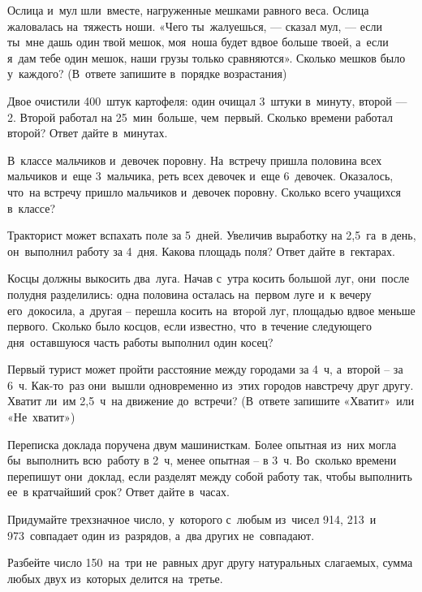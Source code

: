 Ослица и~мул шли~вместе, нагруженные мешками равного веса. Ослица жаловалась на~тяжесть ноши. 
«Чего ты~жалуешься, — сказал мул, — если ты~мне дашь один твой мешок, моя~ноша будет вдвое больше твоей, 
а~если я~дам тебе один мешок, наши грузы только сравняются». Сколько мешков было у~каждого? 
(В~ответе запишите в~порядке возрастания)

Двое очистили 400~штук картофеля: один очищал 3~штуки в~минуту, второй — 2. 
Второй работал на 25~мин~больше, чем~первый. Сколько времени работал второй? Ответ дайте в~минутах.

В~классе мальчиков и~девочек поровну. На~встречу пришла половина всех мальчиков и~еще 3~мальчика, 
реть всех девочек и~еще 6~девочек. Оказалось, что~на встречу пришло мальчиков и~девочек поровну. 
Сколько всего учащихся в~классе?

Тракторист может вспахать поле за 5~дней. Увеличив выработку на 2{,}5~га~в день, он~выполнил работу за 4~дня. 
Какова площадь поля? Ответ дайте в~гектарах.

Косцы должны выкосить два~луга. Начав с~утра косить большой луг, они~после полудня разделились: 
одна половина осталась на~первом луге и~к вечеру его~докосила, а~другая – перешла косить на~второй луг, 
площадью вдвое меньше первого. Сколько было косцов, если известно, 
что~в течение следующего дня~оставшуюся часть работы выполнил один косец?


Первый турист может пройти расстояние между городами за 4~ч, а~второй – за 6~ч. 
Как-то~раз они~вышли одновременно из~этих городов навстречу друг другу. 
Хватит ли~им 2{,}5~ч~на движение до~встречи? 
(В~ответе запишите «Хватит»~или «Не~хватит»)

Переписка доклада поручена двум машинисткам. Более опытная из~них могла бы~выполнить всю~работу в 2~ч, 
менее опытная – в 3~ч. Во~сколько времени перепишут они~доклад, если разделят между собой работу так, 
чтобы выполнить ее~в кратчайший срок? Ответ дайте в~часах.


Придумайте трехзначное число, у~которого с~любым из~чисел 914, 213~и 973~совпадает один из~разрядов, 
а~два других не~совпадают.

Разбейте число 150~на~три не~равных друг другу натуральных слагаемых, сумма любых двух из~которых делится на~третье. 

